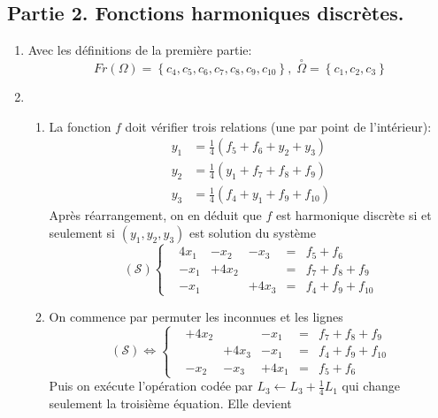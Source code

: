 \subsection*{Partie 2. Fonctions harmoniques discrètes.}
\begin{enumerate}
  \item  Avec les définitions de la première partie:
\begin{displaymath}
Fr(\Omega) = \left\lbrace c_4, c_5, c_6, c_7, c_8, c_9, c_{10}  \right\rbrace, \;
\overset{\circ}{\Omega} = \left\lbrace  c_1,c_2,c_3\right\rbrace   
\end{displaymath}

\item 
\begin{enumerate}
\item La fonction $f$ doit vérifier trois relations (une par point de l'intérieur):
\begin{align*}
  y_1 &= \frac{1}{4}\left( f_5 + f_6 + y_2 + y_3 \right)\\
  y_2 &= \frac{1}{4}\left( y_1 + f_7 + f_8 + f_9 \right)\\
  y_3 &= \frac{1}{4}\left( f_4 + y_1 + f_9 + f_{10} \right)
\end{align*}
Après réarrangement, on en déduit que $f$ est harmonique discrète si et seulement si $(y_1,y_2,y_3)$ est solution du système
\begin{displaymath}
  (\mathcal{S})
\left\lbrace  
\begin{aligned}
  &4x_1 &-x_2   &-x_3  &=& f_5 + f_6\\
  &-x_1 &+4x_2  &      &=& f_7 + f_8 +f_9 \\
  &-x_1 &       &+4x_3 &=& f_4 + f_9 + f_{10}
\end{aligned}
\right. 
\end{displaymath}
\item On commence par permuter les inconnues et les lignes
\begin{displaymath}
  (\mathcal{S}) \Leftrightarrow
\left\lbrace  
\begin{aligned}
  &+4x_2  &      &-x_1  &=& f_7 + f_8 +f_9 \\
  &       &+4x_3 &-x_1 &=& f_4 + f_9 + f_{10} \\
  &-x_2   &-x_3  &+4x_1  &=& f_5 + f_6
\end{aligned}
\right. 
\end{displaymath}
Puis on exécute l'opération codée par $L_3 \leftarrow L_3 + \frac{1}{4}L_1$ qui change seulement la troisième équation. Elle devient

\end{enumerate}
\end{enumerate}
